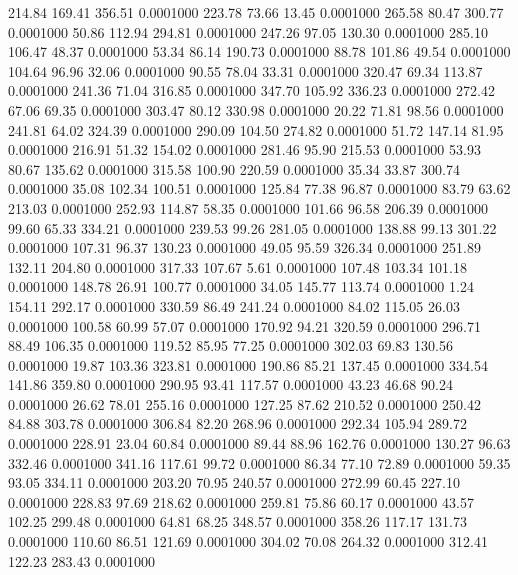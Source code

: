  214.84  169.41  356.51   0.0001000
 223.78   73.66   13.45   0.0001000
 265.58   80.47  300.77   0.0001000
  50.86  112.94  294.81   0.0001000
 247.26   97.05  130.30   0.0001000
 285.10  106.47   48.37   0.0001000
  53.34   86.14  190.73   0.0001000
  88.78  101.86   49.54   0.0001000
 104.64   96.96   32.06   0.0001000
  90.55   78.04   33.31   0.0001000
 320.47   69.34  113.87   0.0001000
 241.36   71.04  316.85   0.0001000
 347.70  105.92  336.23   0.0001000
 272.42   67.06   69.35   0.0001000
 303.47   80.12  330.98   0.0001000
  20.22   71.81   98.56   0.0001000
 241.81   64.02  324.39   0.0001000
 290.09  104.50  274.82   0.0001000
  51.72  147.14   81.95   0.0001000
 216.91   51.32  154.02   0.0001000
 281.46   95.90  215.53   0.0001000
  53.93   80.67  135.62   0.0001000
 315.58  100.90  220.59   0.0001000
  35.34   33.87  300.74   0.0001000
  35.08  102.34  100.51   0.0001000
 125.84   77.38   96.87   0.0001000
  83.79   63.62  213.03   0.0001000
 252.93  114.87   58.35   0.0001000
 101.66   96.58  206.39   0.0001000
  99.60   65.33  334.21   0.0001000
 239.53   99.26  281.05   0.0001000
 138.88   99.13  301.22   0.0001000
 107.31   96.37  130.23   0.0001000
  49.05   95.59  326.34   0.0001000
 251.89  132.11  204.80   0.0001000
 317.33  107.67    5.61   0.0001000
 107.48  103.34  101.18   0.0001000
 148.78   26.91  100.77   0.0001000
  34.05  145.77  113.74   0.0001000
   1.24  154.11  292.17   0.0001000
 330.59   86.49  241.24   0.0001000
  84.02  115.05   26.03   0.0001000
 100.58   60.99   57.07   0.0001000
 170.92   94.21  320.59   0.0001000
 296.71   88.49  106.35   0.0001000
 119.52   85.95   77.25   0.0001000
 302.03   69.83  130.56   0.0001000
  19.87  103.36  323.81   0.0001000
 190.86   85.21  137.45   0.0001000
 334.54  141.86  359.80   0.0001000
 290.95   93.41  117.57   0.0001000
  43.23   46.68   90.24   0.0001000
  26.62   78.01  255.16   0.0001000
 127.25   87.62  210.52   0.0001000
 250.42   84.88  303.78   0.0001000
 306.84   82.20  268.96   0.0001000
 292.34  105.94  289.72   0.0001000
 228.91   23.04   60.84   0.0001000
  89.44   88.96  162.76   0.0001000
 130.27   96.63  332.46   0.0001000
 341.16  117.61   99.72   0.0001000
  86.34   77.10   72.89   0.0001000
  59.35   93.05  334.11   0.0001000
 203.20   70.95  240.57   0.0001000
 272.99   60.45  227.10   0.0001000
 228.83   97.69  218.62   0.0001000
 259.81   75.86   60.17   0.0001000
  43.57  102.25  299.48   0.0001000
  64.81   68.25  348.57   0.0001000
 358.26  117.17  131.73   0.0001000
 110.60   86.51  121.69   0.0001000
 304.02   70.08  264.32   0.0001000
 312.41  122.23  283.43   0.0001000
